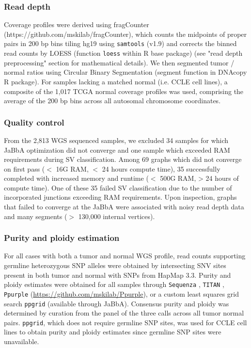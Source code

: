 \documentclass[phd,tocprelim]{cornell}
\begin{document}
\subsubsection*{Read depth} \label{meth:readDepth}
Coverage profiles were derived using fragCounter (https://github.com/mskilab/fragCounter), which counts the midpoints of proper pairs in 200 bp bins tiling hg19 using \texttt{samtools} (v1.9) and corrects the binned read counts by LOESS (function \texttt{loess} within R base package) (see "read depth preprocessing" section for mathematical details). We then segmented tumor / normal ratios using Circular Binary Segmentation \cite{olshen2004} (segment function in DNAcopy R package). For samples lacking a matched normal (i.e. CCLE cell lines), a composite of the 1,017 TCGA normal coverage profiles was used, comprising the average of the 200 bp bins across all autosomal chromosome coordinates.

\subsubsection*{Quality control}
From the 2,813 WGS sequenced samples, we excluded 34 samples for which JaBbA optimization did not converge and one sample which exceeded RAM requirements during SV classification. Among 69 graphs which did not converge on first pass ($<$ 16G RAM, $<$ 24 hours compute time), 35 successfully completed with increased memory and runtime ($<$ 500G RAM, > 24 hours of compute time).  One of these 35 failed SV classification due to the number of incorporated junctions exceeding RAM requirements.  Upon inspection, graphs that failed to converge at the JaBbA were associated with noisy read depth data and many segments ($>$ 130,000 internal vertices).

\subsubsection*{Purity and ploidy estimation}

For all cases with both a tumor and normal WGS profile, read counts supporting germline heterozygous SNP alleles were obtained by intersecting SNV sites present in both tumor and normal with SNPs from HapMap 3.3. Purity and ploidy estimates were obtained for all samples through \texttt{Sequenza} \cite{Favero2015-zd}, \texttt{TITAN} \cite{ha2014}, \texttt{Ppurple}  (\url{https://github.com/mskilab/Ppurple}), or a custom least squares grid search \texttt{ppgrid} (available through JaBbA). Consensus purity and ploidy was determined by curation from the panel of the three calls across all tumor normal pairs. \texttt{ppgrid}, which does not require germline SNP sites, was used for CCLE cell lines to obtain purity and ploidy estimates since germline SNP sites were unavailable.
\end{document}
